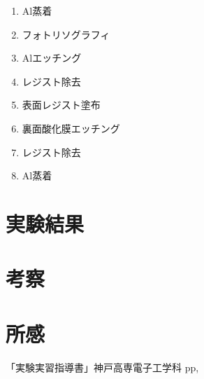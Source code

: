 \documentclass[11pt]{jarticle}
\begin{document}
\begin{enumerate}
			\item Al蒸着\\
			\item フォトリソグラフィ\\
			\item Alエッチング\\
			\item レジスト除去\\
			\item 表面レジスト塗布\\
			\item 裏面酸化膜エッチング\\
			\item レジスト除去\\
			\item Al蒸着\\
		\end{enumerate}
	\section{実験結果}
\section{考察}
\section{所感}
\begin{thebibliography}{99}
「実験実習指導書」神戸高専電子工学科 pp,
\end{thebibliography}
\end{document}
